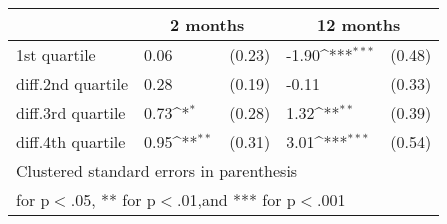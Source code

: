 {
\def\sym#1{\ifmmode^{#1}\else\(^{#1}\)\fi}
\begin{tabular*}{.65\hsize}{@{\hskip\tabcolsep\extracolsep\fill}l*{2}{lc}}
\toprule
                &\multicolumn{2}{c}{2 months}&\multicolumn{2}{c}{12 months}\\
\midrule
1st quartile    &     0.06         &   (0.23)&    -1.90\sym{***}&   (0.48)\\
diff.2nd quartile&     0.28         &   (0.19)&    -0.11         &   (0.33)\\
diff.3rd quartile&     0.73\sym{*}  &   (0.28)&     1.32\sym{**} &   (0.39)\\
diff.4th quartile&     0.95\sym{**} &   (0.31)&     3.01\sym{***}&   (0.54)\\
\bottomrule
\multicolumn{5}{l}{\footnotesize Clustered standard errors in parenthesis}\\
\multicolumn{5}{l}{\footnotesize * for p$<$.05, ** for p$<$.01,and *** for p$<$.001}\\
\end{tabular*}
}
